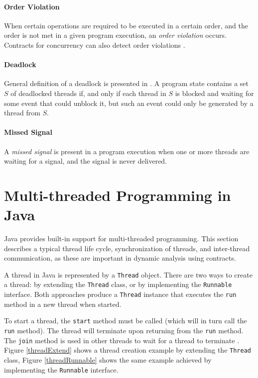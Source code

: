 \paragraph{Order Violation}
When certain operations are required to be executed
in a certain order, and the order is not met in a given program execution, an
\emph{order violation} occurs. Contracts for concurrency can also detect order
violations \cite{contracts}.

\paragraph{Deadlock}
General definition of a deadlock is presented in
\cite{letko}. A program state contains a set $S$ of deadlocked threads if, and
only if each thread in $S$ is blocked and waiting for some event that could
unblock it, but such an event could only be generated by a thread from $S$.

\paragraph{Missed Signal}
A \emph{missed signal} is present in a program execution when one or more
threads are waiting for a signal, and the signal is never delivered.

\section{Multi-threaded Programming in Java}

Java provides built-in support for multi-threaded programming. This section
describes a typical thread life cycle, synchronization of threads, and
inter-thread communication, as these are important in dynamic analysis using
contracts.

A thread in Java is represented by a \texttt{Thread} object. There are two ways
to create a thread: by extending the \texttt{Thread} class, or by implementing
the \texttt{Runnable} interface. Both approaches produce a \texttt{Thread}
instance that executes the \texttt{run} method in a new thread when started.

To start a thread, the \texttt{start} method must be called (which will in
turn call the \texttt{run} method). The thread will terminate upon returning
from the \texttt{run} method. The \texttt{join} method is used in other
threads to wait for a thread to terminate \cite{javaTheCompleteReference}.
Figure \ref{threadExtend} shows a thread creation example by extending the
\texttt{Thread} class, Figure \ref{threadRunnable} shows the same example
achieved by implementing the \texttt{Runnable} interface.


